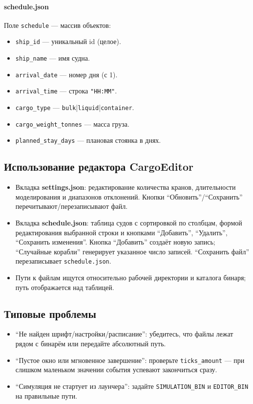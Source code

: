 \documentclass[12pt,a4paper]{article}
\begin{document}
\paragraph{schedule.json}
Поле \texttt{schedule} — массив объектов:
\begin{itemize}[noitemsep]
    \item \texttt{ship\_id} — уникальный id (целое).
    \item \texttt{ship\_name} — имя судна.
    \item \texttt{arrival\_date} — номер дня (с 1).
    \item \texttt{arrival\_time} — строка \texttt{"HH:MM"}.
    \item \texttt{cargo\_type} — \texttt{bulk}|\texttt{liquid}|\texttt{container}.
    \item \texttt{cargo\_weight\_tonnes} — масса груза.
    \item \texttt{planned\_stay\_days} — плановая стоянка в днях.
\end{itemize}

\subsection{Использование редактора CargoEditor}
\begin{itemize}[noitemsep]
    \item Вкладка \textbf{settings.json}: редактирование количества кранов, длительности моделирования и диапазонов отклонений. Кнопки ``Обновить''/``Сохранить'' перечитывают/перезаписывают файл.
    \item Вкладка \textbf{schedule.json}: таблица судов с сортировкой по столбцам, формой редактирования выбранной строки и кнопками ``Добавить'', ``Удалить'', ``Сохранить изменения''. Кнопка ``Добавить'' создаёт новую запись; ``Случайные корабли'' генерирует указанное число записей. ``Сохранить файл'' перезаписывает \verb|schedule.json|.
    \item Пути к файлам ищутся относительно рабочей директории и каталога бинаря; путь отображается над таблицей.
\end{itemize}

\subsection{Типовые проблемы}
\begin{itemize}[noitemsep]
    \item ``Не найден шрифт/настройки/расписание'': убедитесь, что файлы лежат рядом с бинарём или передайте абсолютный путь.
    \item ``Пустое окно или мгновенное завершение'': проверьте \verb|ticks_amount| — при слишком маленьком значении события успевают закончиться сразу.
    \item ``Симуляция не стартует из лаунчера'': задайте \verb|SIMULATION_BIN| и \verb|EDITOR_BIN| на правильные пути.
\end{itemize}
\end{document}
